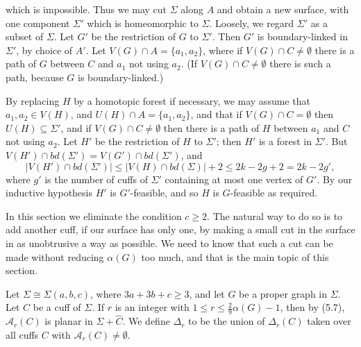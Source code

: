 \noindent which is impossible. Thus we may cut $\Sigma$ along $A$ and obtain a new surface, with one component $\Sigma'$ which is homeomorphic to $\Sigma$. Loosely, we regard $\Sigma'$ as a subset of $\Sigma$. Let $G'$ be the restriction of $G$ to $\Sigma'$. Then $G'$ is boundary-linked in $\Sigma'$, by choice of $A'$. Let $V(G) \cap A = \{a_1, a_2\}$, where if $V(G) \cap C \ne \emptyset$ there is a path of $G$ between $C$ and $a_1$ not using $a_2$. (If $V(G) \cap C \ne \emptyset$ there is such a path, because $G$ is boundary-linked.)

By replacing $H$ by a homotopic forest if necessary, we may assume that $a_1, a_2 \in V(H)$, and $U(H) \cap A = \{a_1, a_2\}$, and that if $V(G) \cap C = \emptyset$ then $U(H) \subseteq \Sigma'$, and if $V(G) \cap C \ne \emptyset$ then there is a path of $H$ between $a_1$ and $C$ not using $a_2$. Let $H'$ be the restriction of $H$ to $\Sigma'$; then $H'$ is a forest in $\Sigma'$. But $V(H') \cap bd(\Sigma') = V(G') \cap bd(\Sigma')$, and
\begin{equation*}
|V(H') \cap bd(\Sigma')| \le |V(H) \cap bd(\Sigma)| + 2 \le 2k - 2g + 2 = 2k - 2g',
\end{equation*}
where $g'$ is the number of cuffs of $\Sigma'$ containing at most one vertex of $G'$. By our inductive hypothesis $H'$ is $G'$-feasible, and so $H$ is $G$-feasible as required.


In this section we eliminate the condition $c \ge 2$. The natural way to do so is to add another cuff, if our surface has only one, by making a small cut in the surface in as unobtrusive a way as possible. We need to know that such a cut can be made without reducing $\alpha(G)$ too much, and that is the main topic of this section.

Let $\Sigma \cong \Sigma(a, b, c)$, where $3a + 3b + c \ge 3$, and let $G$ be a proper graph in $\Sigma$. Let $C$ be a cuff of $\Sigma$. If $r$ is an integer with $1 \le r \le \frac{2}{9}\alpha(G) - 1$, then by (5.7), $\mathcal{A}_r(C)$ is planar in $\Sigma + \hat{C}$.   We define $\Delta_r$ to be the union of $\Delta_r(C)$ taken over all cuffs $C$ with $\mathcal{A}_r(C) \ne \emptyset$.

